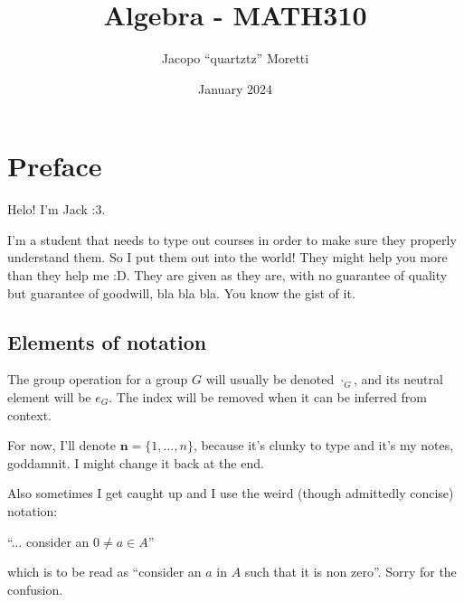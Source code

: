 \documentclass{report} %
\title{Algebra - MATH310}
\author{Jacopo ``quartztz'' Moretti}
\date{January 2024}
\theoremstyle{plain}
\begin{document}
  \maketitle

  \chapter*{Preface}
  Helo! I'm Jack :3.

  I'm a student that needs to type out courses in order to make sure they properly understand them. So I put them out into the world! They might help you more than they help me :D. They are given as they are, with no guarantee of quality but guarantee of goodwill, bla bla bla. You know the gist of it. 

  \section*{Elements of notation}

  The group operation for a group $G$ will usually be denoted $\cdot_G$, and its neutral element will be $e_G$. The index will be removed when it can be inferred from context. 

  For now, I'll denote $\mathbf{n} = \{1, ..., n\}$, because it's clunky to type and it's my notes, goddamnit. I might change it back at the end.

  Also sometimes I get caught up and I use the weird (though admittedly concise) notation:
  \begin{center}
    ``... consider an $0 \neq a \in A$''
  \end{center}
  which is to be read as ``consider an $a$ in $A$ such that it is non zero''. Sorry for the confusion.

  \tableofcontents

  \pagebreak

  
  
  
  

  \appendix
  
  
  
  
\end{document}
